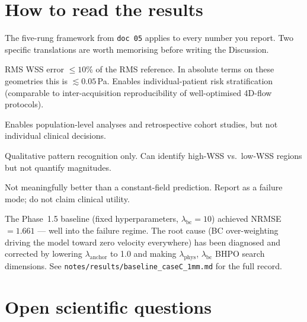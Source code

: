\documentclass[11pt]{article}
\begin{document}
\section{How to read the results}

The five-rung framework from \texttt{doc~05} applies to every number you report.
Two specific translations are worth memorising before writing the Discussion.

\begin{description}[leftmargin=0pt]
\item[NRMSE $< 0.10$\,($10$\,\%)]
    RMS WSS error $\leq 10$\% of the RMS reference.  In absolute terms on these
    geometries this is $\lesssim 0.05$\,Pa.  Enables individual-patient risk
    stratification (comparable to inter-acquisition reproducibility of well-optimised
    4D-flow protocols).
\item[NRMSE $0.10$--$0.20$]
    Enables population-level analyses and retrospective cohort studies, but not
    individual clinical decisions.
\item[NRMSE $0.20$--$0.40$]
    Qualitative pattern recognition only.  Can identify high-WSS vs.\ low-WSS regions
    but not quantify magnitudes.
\item[NRMSE $> 0.40$]
    Not meaningfully better than a constant-field prediction.  Report as a failure
    mode; do not claim clinical utility.
\end{description}

The Phase~1.5 baseline (fixed hyperparameters, $\lambda_{\text{bc}} = 10$) achieved
NRMSE\,$= 1.661$ — well into the failure regime.  The root cause (BC over-weighting
driving the model toward zero velocity everywhere) has been diagnosed and corrected
by lowering $\lambda_{\text{anchor}}$ to 1.0 and making $\lambda_{\text{phys}}$,
$\lambda_{\text{bc}}$ BHPO search dimensions.
See \texttt{notes/results/baseline\_caseC\_1mm.md} for the full record.

\section{Open scientific questions}
\end{document}
